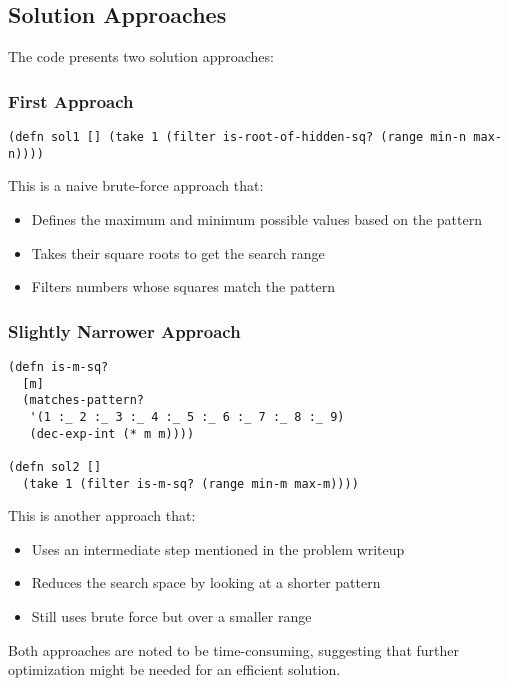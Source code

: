 \subsection{Solution Approaches}

The code presents two solution approaches:

\subsubsection{First Approach}
\begin{lstlisting}
(defn sol1 [] (take 1 (filter is-root-of-hidden-sq? (range min-n max-n))))
\end{lstlisting}

This is a naive brute-force approach that:
\begin{itemize}
    \item Defines the maximum and minimum possible values based on the pattern
    \item Takes their square roots to get the search range
    \item Filters numbers whose squares match the pattern
\end{itemize}

\subsubsection{Slightly Narrower Approach}
\begin{lstlisting}
(defn is-m-sq?
  [m]
  (matches-pattern?
   '(1 :_ 2 :_ 3 :_ 4 :_ 5 :_ 6 :_ 7 :_ 8 :_ 9)
   (dec-exp-int (* m m))))

(defn sol2 [] 
  (take 1 (filter is-m-sq? (range min-m max-m))))
\end{lstlisting}

This is another approach that:
\begin{itemize}
    \item Uses an intermediate step mentioned in the problem writeup
    \item Reduces the search space by looking at a shorter pattern
    \item Still uses brute force but over a smaller range
\end{itemize}

Both approaches are noted to be time-consuming, suggesting that further optimization might be needed for an efficient solution.